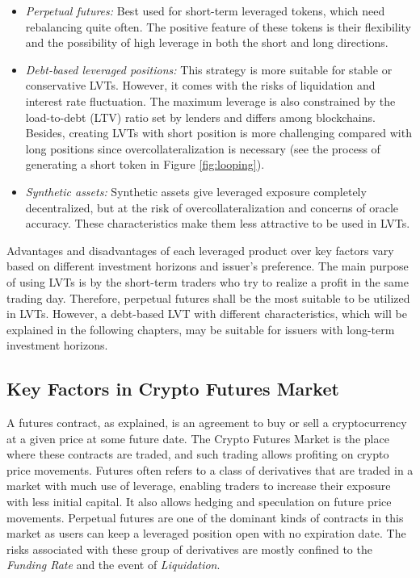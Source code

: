 \begin{itemize}
	\item \textit{Perpetual futures:} Best used for short-term leveraged tokens, which need rebalancing quite often. The positive feature of these tokens is their flexibility and the possibility of high leverage in both the short and long directions.
	
	\item \textit{Debt-based leveraged positions:} This strategy is more suitable for stable or conservative LVTs. However, it comes with the risks of liquidation and interest rate fluctuation. The maximum leverage is also constrained by the load-to-debt (LTV) ratio set by lenders and differs among blockchains. Besides, creating LVTs with short position is more challenging compared with long positions since overcollateralization is necessary (see the process of generating a short token in Figure \ref{fig:looping}).
	
	\item \textit{Synthetic assets:} Synthetic assets give leveraged exposure completely decentralized, but at the risk of overcollateralization and concerns of oracle accuracy. These characteristics make them less attractive to be used in LVTs.
\end{itemize}
Advantages and disadvantages of each leveraged product over key factors vary based on different investment horizons and issuer's preference. The main purpose of using LVTs is by the short-term traders who try to realize a profit in the same trading day. Therefore, perpetual futures shall be the most suitable to be utilized in LVTs. However, a debt-based LVT with different characteristics, which will be explained in the following chapters, may be suitable for issuers with long-term investment horizons.

\subsection{Key Factors in Crypto Futures Market}\label{appx:futures}
A futures contract, as explained, is an agreement to buy or sell a cryptocurrency at a given price at some future date. The Crypto Futures Market is the place where these contracts are traded, and such trading allows profiting on crypto price movements. Futures often refers to a class of derivatives that are traded in a market with much use of leverage, enabling traders to increase their exposure with less initial capital. It also allows hedging and speculation on future price movements. Perpetual futures are one of the dominant kinds of contracts in this market as users can keep a leveraged position open with no expiration date. The risks associated with these group of derivatives are mostly confined to the \textsl{Funding Rate} and the event of \textsl{Liquidation}.

